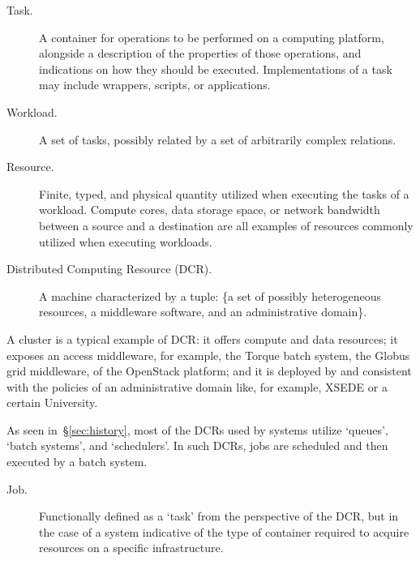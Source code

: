 \documentclass{sig-alternate}
\begin{document}
\begin{description}

\item[Task.] A container for operations to be performed on a computing platform,
alongside a description of the properties of those operations, and indications
on how they should be executed. Implementations of a task may include wrappers,
scripts, or applications.

\item[Workload.] A set of tasks, possibly related by a set of arbitrarily
complex relations.

\item[Resource.] Finite, typed, and physical quantity utilized when executing
the tasks of a workload. Compute cores, data storage space, or network bandwidth
between a source and a destination are all examples of resources commonly
utilized when executing workloads.

\item[Distributed Computing Resource (DCR).] A machine characterized by a tuple:
\{a set of possibly heterogeneous resources, a middleware software, and an
administrative domain\}.


\end{description}

A cluster is a typical example of DCR: it offers compute and data resources; it
exposes an access middleware, for example, the Torque batch system, the Globus
grid middleware, of the OpenStack platform; and it is deployed by and consistent
with the policies of an administrative domain like, for example, XSEDE or a
certain University.

As seen in~\S\ref{sec:history}, most of the DCRs used by \pilotjob systems
utilize `queues', `batch systems', and `schedulers'. In such DCRs, jobs are
scheduled and then executed by a batch system.

\begin{description}

\item[Job.] Functionally defined as a `task' from the perspective of the DCR,
but in the case of a \pilotjob system indicative of the type of container
required to acquire resources on a specific infrastructure.

\end{description}
\end{document}
